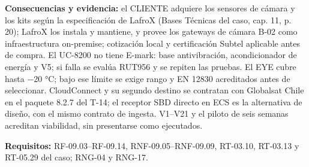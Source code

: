 \textbf{Consecuencias y evidencia:} el CLIENTE adquiere los sensores de cámara y los kits según la especificación de LafroX (Bases Técnicas del caso, cap. 11, p. 20); LafroX los instala y mantiene, y provee los gateways de cámara B-02 como infraestructura on-premise; cotización local y certificación Subtel aplicable antes de compra. El UC-8200 no tiene E-mark: base antivibración, acondicionador de energía y V5; si falla se evalúa RUT956 y se repiten las pruebas. El EYE cubre hasta −20 °C; bajo ese límite se exige rango y EN 12830 acreditados antes de seleccionar. CloudConnect y su segundo destino se contratan con Globalsat Chile en el paquete 8.2.7 del T-14; el receptor SBD directo en ECS es la alternativa de diseño, con el mismo contrato de ingesta. V1–V21 y el piloto de seis semanas acreditan viabilidad, sin presentarse como ejecutados.

\textbf{Requisitos:} RF-09.03–RF-09.14, RNF-09.05–RNF-09.09, RT-03.10, RT-03.13 y RT-05.29 del caso; RNG-04 y RNG-17.

\label{fuente-18-anexo-4-1-o-decisiones-logicas-fin}
